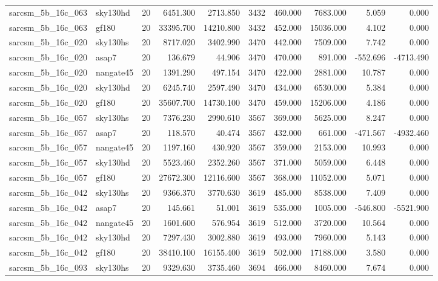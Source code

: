 \documentclass{article}
\begin{document}
\begin{longtable}{llrrrrrrrr}
sarcsm\_5b\_16c\_063 & sky130hd & 20 & 6451.300 & 2713.850 & 3432 & 460.000 & 7683.000 & 5.059 & 0.000 \\
sarcsm\_5b\_16c\_063 & gf180 & 20 & 33395.700 & 14210.800 & 3432 & 452.000 & 15036.000 & 4.102 & 0.000 \\
sarcsm\_5b\_16c\_020 & sky130hs & 20 & 8717.020 & 3402.990 & 3470 & 442.000 & 7509.000 & 7.742 & 0.000 \\
sarcsm\_5b\_16c\_020 & asap7 & 20 & 136.679 & 44.906 & 3470 & 470.000 & 891.000 & -552.696 & -4713.490 \\
sarcsm\_5b\_16c\_020 & nangate45 & 20 & 1391.290 & 497.154 & 3470 & 422.000 & 2881.000 & 10.787 & 0.000 \\
sarcsm\_5b\_16c\_020 & sky130hd & 20 & 6245.740 & 2597.490 & 3470 & 434.000 & 6530.000 & 5.384 & 0.000 \\
sarcsm\_5b\_16c\_020 & gf180 & 20 & 35607.700 & 14730.100 & 3470 & 459.000 & 15206.000 & 4.186 & 0.000 \\
sarcsm\_5b\_16c\_057 & sky130hs & 20 & 7376.230 & 2990.610 & 3567 & 369.000 & 5625.000 & 8.247 & 0.000 \\
sarcsm\_5b\_16c\_057 & asap7 & 20 & 118.570 & 40.474 & 3567 & 432.000 & 661.000 & -471.567 & -4932.460 \\
sarcsm\_5b\_16c\_057 & nangate45 & 20 & 1197.160 & 430.920 & 3567 & 359.000 & 2153.000 & 10.993 & 0.000 \\
sarcsm\_5b\_16c\_057 & sky130hd & 20 & 5523.460 & 2352.260 & 3567 & 371.000 & 5059.000 & 6.448 & 0.000 \\
sarcsm\_5b\_16c\_057 & gf180 & 20 & 27672.300 & 12116.600 & 3567 & 368.000 & 11052.000 & 5.071 & 0.000 \\
sarcsm\_5b\_16c\_042 & sky130hs & 20 & 9366.370 & 3770.630 & 3619 & 485.000 & 8538.000 & 7.409 & 0.000 \\
sarcsm\_5b\_16c\_042 & asap7 & 20 & 145.661 & 51.001 & 3619 & 535.000 & 1005.000 & -546.800 & -5521.900 \\
sarcsm\_5b\_16c\_042 & nangate45 & 20 & 1601.600 & 576.954 & 3619 & 512.000 & 3720.000 & 10.564 & 0.000 \\
sarcsm\_5b\_16c\_042 & sky130hd & 20 & 7297.430 & 3002.880 & 3619 & 493.000 & 7960.000 & 5.143 & 0.000 \\
sarcsm\_5b\_16c\_042 & gf180 & 20 & 38410.100 & 16155.400 & 3619 & 502.000 & 17188.000 & 3.580 & 0.000 \\
sarcsm\_5b\_16c\_093 & sky130hs & 20 & 9329.630 & 3735.460 & 3694 & 466.000 & 8460.000 & 7.674 & 0.000 \\

\end{longtable}
\end{document}
